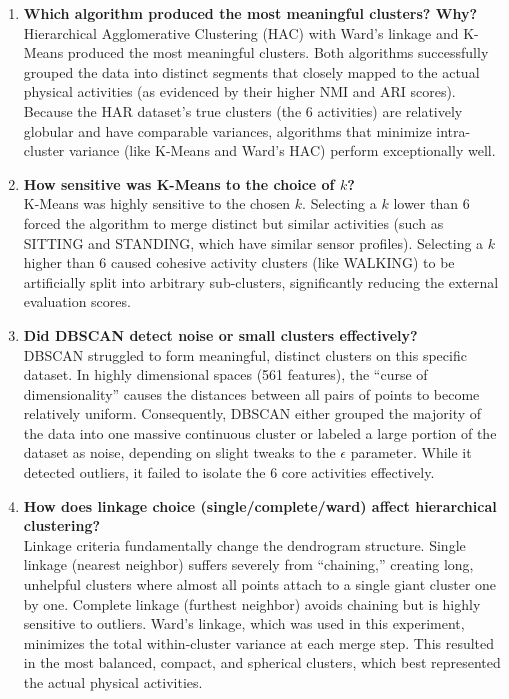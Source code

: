 \documentclass[11pt]{article}
\begin{document}
\begin{enumerate}

\item \textbf{Which algorithm produced the most meaningful clusters? Why?} \\
Hierarchical Agglomerative Clustering (HAC) with Ward's linkage and K-Means produced the most meaningful clusters. Both algorithms successfully grouped the data into distinct segments that closely mapped to the actual physical activities (as evidenced by their higher NMI and ARI scores). Because the HAR dataset's true clusters (the 6 activities) are relatively globular and have comparable variances, algorithms that minimize intra-cluster variance (like K-Means and Ward's HAC) perform exceptionally well.

\item \textbf{How sensitive was K-Means to the choice of $k$?} \\
K-Means was highly sensitive to the chosen $k$. Selecting a $k$ lower than 6 forced the algorithm to merge distinct but similar activities (such as SITTING and STANDING, which have similar sensor profiles). Selecting a $k$ higher than 6 caused cohesive activity clusters (like WALKING) to be artificially split into arbitrary sub-clusters, significantly reducing the external evaluation scores.

\item \textbf{Did DBSCAN detect noise or small clusters effectively?} \\
DBSCAN struggled to form meaningful, distinct clusters on this specific dataset. In highly dimensional spaces (561 features), the ``curse of dimensionality'' causes the distances between all pairs of points to become relatively uniform. Consequently, DBSCAN either grouped the majority of the data into one massive continuous cluster or labeled a large portion of the dataset as noise, depending on slight tweaks to the $\epsilon$ parameter. While it detected outliers, it failed to isolate the 6 core activities effectively.

\item \textbf{How does linkage choice (single/complete/ward) affect hierarchical clustering?} \\
Linkage criteria fundamentally change the dendrogram structure. Single linkage (nearest neighbor) suffers severely from ``chaining,'' creating long, unhelpful clusters where almost all points attach to a single giant cluster one by one. Complete linkage (furthest neighbor) avoids chaining but is highly sensitive to outliers. Ward's linkage, which was used in this experiment, minimizes the total within-cluster variance at each merge step. This resulted in the most balanced, compact, and spherical clusters, which best represented the actual physical activities.


\end{enumerate}
\end{document}
